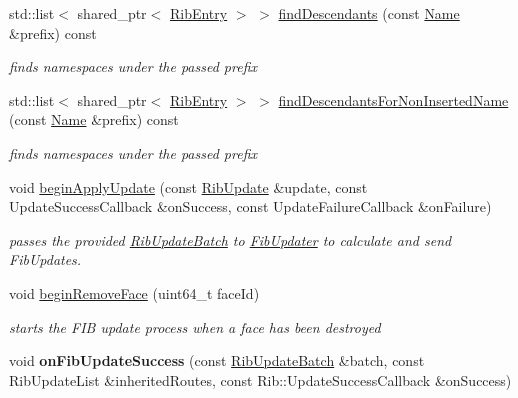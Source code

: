 \begin{DoxyCompactItemize}
\item 
std\+::list$<$ shared\+\_\+ptr$<$ \hyperlink{classnfd_1_1rib_1_1RibEntry}{Rib\+Entry} $>$ $>$ \hyperlink{classnfd_1_1rib_1_1Rib_a4e342d0ce64703adee1f20453161ec7e}{find\+Descendants} (const \hyperlink{classndn_1_1Name}{Name} \&prefix) const
\begin{DoxyCompactList}\small\item\em finds namespaces under the passed prefix \end{DoxyCompactList}\item 
std\+::list$<$ shared\+\_\+ptr$<$ \hyperlink{classnfd_1_1rib_1_1RibEntry}{Rib\+Entry} $>$ $>$ \hyperlink{classnfd_1_1rib_1_1Rib_af3e7449ba58f8765c89273a39089e5fe}{find\+Descendants\+For\+Non\+Inserted\+Name} (const \hyperlink{classndn_1_1Name}{Name} \&prefix) const
\begin{DoxyCompactList}\small\item\em finds namespaces under the passed prefix \end{DoxyCompactList}\item 
void \hyperlink{classnfd_1_1rib_1_1Rib_aeee7690ba0d79b680ccff0847eb5b7f9}{begin\+Apply\+Update} (const \hyperlink{classnfd_1_1rib_1_1RibUpdate}{Rib\+Update} \&update, const Update\+Success\+Callback \&on\+Success, const Update\+Failure\+Callback \&on\+Failure)
\begin{DoxyCompactList}\small\item\em passes the provided \hyperlink{classnfd_1_1rib_1_1RibUpdateBatch}{Rib\+Update\+Batch} to \hyperlink{classnfd_1_1rib_1_1FibUpdater}{Fib\+Updater} to calculate and send Fib\+Updates. \end{DoxyCompactList}\item 
void \hyperlink{classnfd_1_1rib_1_1Rib_a84fd78393198287d353ec1a8263847fd}{begin\+Remove\+Face} (uint64\+\_\+t face\+Id)\hypertarget{classnfd_1_1rib_1_1Rib_a84fd78393198287d353ec1a8263847fd}{}\label{classnfd_1_1rib_1_1Rib_a84fd78393198287d353ec1a8263847fd}

\begin{DoxyCompactList}\small\item\em starts the F\+IB update process when a face has been destroyed \end{DoxyCompactList}\item 
void {\bfseries on\+Fib\+Update\+Success} (const \hyperlink{classnfd_1_1rib_1_1RibUpdateBatch}{Rib\+Update\+Batch} \&batch, const Rib\+Update\+List \&inherited\+Routes, const Rib\+::\+Update\+Success\+Callback \&on\+Success)\hypertarget{classnfd_1_1rib_1_1Rib_a26e9a7fd75c918f1f3f271d17ffcb658}{}\label{classnfd_1_1rib_1_1Rib_a26e9a7fd75c918f1f3f271d17ffcb658}


\end{DoxyCompactItemize}
